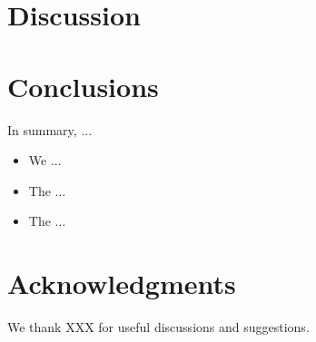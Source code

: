 \documentclass[useAMS,usenatbib]{mn2e}
\begin{document}




\section{Discussion}
\label{sec:discuss}



\section{Conclusions}
\label{sec:conclusions}

In summary, ...

\begin{itemize}

\item We ...

\item The ...

\item The ...

\end{itemize}




\section*{Acknowledgments}
 
We thank XXX for useful discussions and suggestions.



% 
% 
% 
% 
\end{document}
